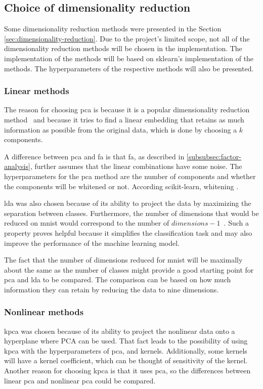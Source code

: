 \subsection{Choice of dimensionality reduction}\label{sec:choice-of-dimensionality-reduction}
Some dimensionality reduction methods were presented in the Section \ref{sec:dimensionality-reduction}. Due to the project's limited scope, not all of the dimensionality reduction methods will be chosen in the implementation. The implementation of the methods will be based on \gls{sklearn}'s implementation of the methods. The hyperparameters of the respective methods will also be presented.



\subsubsection{Linear methods}
The reason for choosing \gls{pca} is because it is a popular dimensionality reduction method~\cite{dimensionality-reduction-comparative-review} and because it tries to find a linear embedding that retains as much information as possible from the original data, which is done by choosing a $k$ components.

A difference between \gls{pca} and \gls{fa} is that \gls{fa}, as described in \ref{subsubsec:factor-analysis}, further assumes that the linear combinations have some noise. The hyperparameters for the \gls{pca} method are the number of components and whether the components will be whitened or not. According scikit-learn, whitening .


\gls{lda} was also chosen because of its ability to project the data by maximizing the separation between classes. Furthermore, the number of dimensions that would be reduced on \gls{mnist} would correspond to the number of $dimensions-1$~\cite{scikit-learn, sklearn-api}. Such a property proves helpful because it simplifies the classification task and may also improve the performance of the machine learning model.

The fact that the number of dimensions reduced for \gls{mnist} will be maximally about the same as the number of classes might provide a good starting point for \gls{pca} and \gls{lda} to be compared. The comparison can be based on how much information they can retain by reducing the data to nine dimensions.


\subsubsection{Nonlinear methods}
\gls{kpca} was chosen because of its ability to project the nonlinear data onto a hyperplane where PCA can be used. That fact leads to the possibility of using \gls{kpca} with the hyperparameters of \gls{pca}, and kernels. Additionally, some kernels will have a kernel coefficient, which can be thought of sensitivity of the kernel. Another reason for choosing \gls{kpca} is that it uses \gls{pca}, so the differences between linear \gls{pca} and nonlinear \gls{pca} could be compared.

